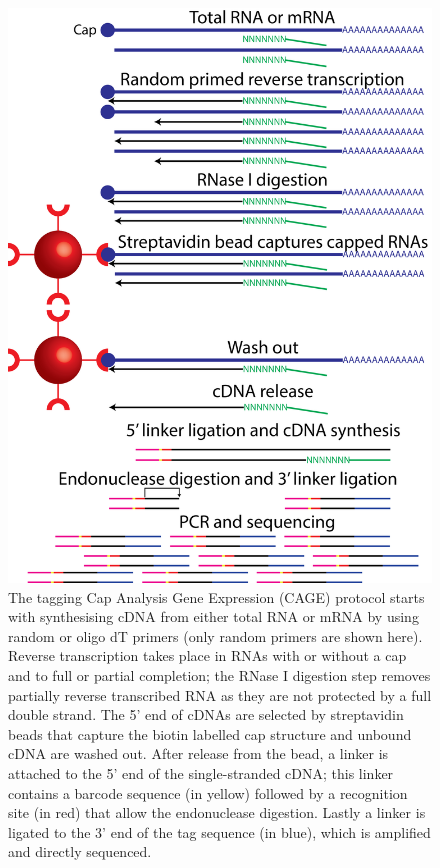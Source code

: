 \documentclass[10pt,a4paper,sans]{article}
\begin{document}
\begin{figure}[!ht]
   \centering
   \includegraphics[width=\textwidth,natwidth=2254,natheight=3051,totalheight=0.65\textheight,keepaspectratio]{cage_protocol.png}
   \caption[Cap Analysis Gene Expression protocol]{\small The tagging Cap Analysis Gene Expression (CAGE) protocol starts with synthesising cDNA from either total RNA or mRNA by using random or oligo dT primers (only random primers are shown here). Reverse transcription takes place in RNAs with or without a cap and to full or partial completion; the RNase I digestion step removes partially reverse transcribed RNA as they are not protected by a full double strand. The 5' end of cDNAs are selected by streptavidin beads that capture the biotin labelled cap structure and unbound cDNA are washed out. After release from the bead, a linker is attached to the 5' end of the single-stranded cDNA; this linker contains a barcode sequence (in yellow) followed by a recognition site (in red) that allow the endonuclease digestion. Lastly a linker is ligated to the 3' end of the tag sequence (in blue), which is amplified and directly sequenced.}
\end{figure}
\end{document}
